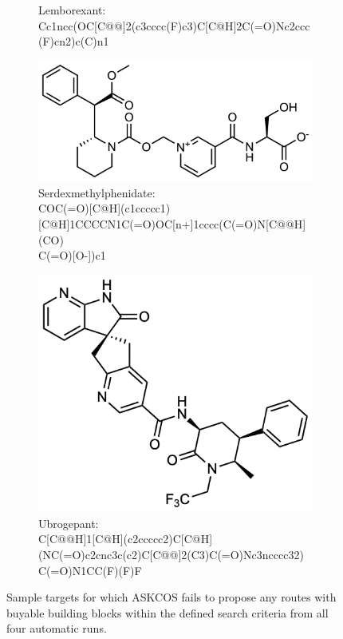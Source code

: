 \documentclass[pdflatex,sn-mathphys-num]{sn-jnl}%
\theoremstyle{thmstyleone}%
\theoremstyle{thmstyletwo}%
\theoremstyle{thmstylethree}%
\begin{document}
\begin{figure}[h!]
\begin{subfigure}[t]{1.0\textwidth}
        \caption{Lemborexant: \\ \small Cc1ncc(OC[C@@]2(c3cccc(F)c3)C[C@H]2C(=O)Nc2ccc(F)cn2)c(C)n1}
    \end{subfigure}
    \hfill
    \vspace{0.5cm}
    \begin{subfigure}[t]{1.0\textwidth}
        \includegraphics[scale=0.725]{media/SI_study/4f.serdexmethylphenidate_f.png}
        \caption{Serdexmethylphenidate: \\ \small COC(=O)[C@H](c1ccccc1)[C@H]1CCCCN1C(=O)OC[n+]1cccc(C(=O)N[C@@H](CO) \\ C(=O)[O-])c1}
    \end{subfigure}
    \hfill
    \vspace{0.5cm}
    \begin{subfigure}[t]{1.0\textwidth}
        \includegraphics[scale=0.725]{media/SI_study/5f.ubrogepant_f.png}
        \caption{Ubrogepant: \\ \small C[C@@H]1[C@H](c2ccccc2)C[C@H](NC(=O)c2cnc3c(c2)C[C@@]2(C3)C(=O)Nc3ncccc32) \\ C(=O)N1CC(F)(F)F}
    \end{subfigure}
    \hfill
    \caption{Sample targets for which ASKCOS fails to propose any routes with buyable building blocks within the defined search criteria from all four automatic runs.}
    \label{fig:fda_study_fail}
\end{figure}

\clearpage

\end{document}
